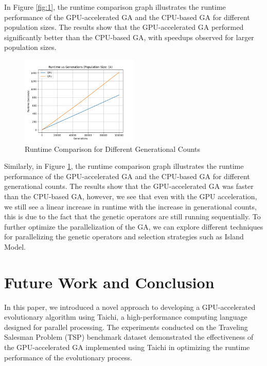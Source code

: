 \documentclass[conference]{IEEEtran}
\begin{document}
In Figure \ref*{fig:1}, the runtime comparison graph illustrates the runtime
performance of the GPU-accelerated GA and the CPU-based GA for different
population sizes. The results show that the GPU-accelerated GA performed
significantly better than the CPU-based GA, with speedups observed for larger
population sizes.

\begin{figure}[H]
    \centerline{\includegraphics[width=0.5\textwidth]{runtime_vs_generations.png}}
    \caption{Runtime Comparison for Different Generational Counts}
    \label{fig:2}
\end{figure}

Similarly, in Figure \ref*{fig:2}, the runtime comparison graph illustrates the
runtime performance of the GPU-accelerated GA and the CPU-based GA for
different generational counts. The results show that the GPU-accelerated GA was
faster than the CPU-based GA, however, we see that even with the GPU
acceleration, we still see a linear increase in runtime with the increase in
generational counts, this is due to the fact that the genetic operators are
still running sequentially. To further optimize the parallelization of the GA,
we can explore different techniques for parallelizing the genetic operators and
selection strategies such as Island Model.
\section{Future Work and Conclusion}
In this paper, we introduced a novel approach to developing a GPU-accelerated
evolutionary algorithm using Taichi, a high-performance computing language
designed for parallel processing. The experiments conducted on the Traveling
Salesman Problem (TSP) benchmark dataset demonstrated the effectiveness of the
GPU-accelerated GA implemented using Taichi in optimizing the runtime
performance of the evolutionary process.
\end{document}
